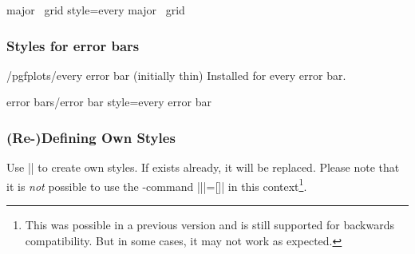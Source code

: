 \pgfplotsshortxystylekey major \x\ grid style=every major \x\ grid\pgfeov

\subsubsection*{Styles for error bars}

\begin{stylekey}{/pgfplots/every error bar (initially thin)}
 Installed for every error bar. 
\end{stylekey}

\pgfplotsshortstylekey error bars/error bar style=every error bar\pgfeov

\subsubsection{(Re-)Defining Own Styles}
\label{sec:styles:own}%
Use ||
to create own styles. If  exists already, it will be replaced. Please note that it is \emph{not} possible to use the \Tikz-command |\tikzstyle||=[]| in this context\footnote{This was possible in a previous version and is still supported for backwards compatibility. But in some cases, it may not work as expected.}.
\begin{codeexample}[]

\end{codeexample}
